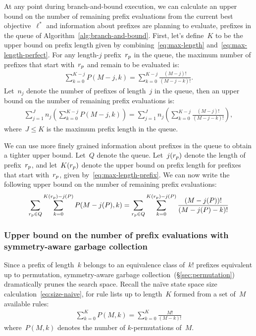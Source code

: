 At any point during branch-and-bound execution, we can calculate an upper bound
on the number of remaining prefix evaluations from the current best objective~$\ell^*$
and information about prefixes are planning to evaluate,
\ie prefixes in the queue of Algorithm~\ref{alg:branch-and-bound}.
%
First, let's define~$K$ to be the upper bound on prefix length
given by combining~\eqref{eq:max-length} and~\eqref{eq:max-length-perfect}.
%
For any length-$j$ prefix~${r_p}$ in the queue,
the maximum number of prefixes that start with~${r_p}$ and remain to be evaluated is:
\begin{align}
\sum_{k=0}^{K-j} P(M-j, k) = \sum_{k=0}^{K-j} \frac{(M-j)!}{(M-j - k)!}.
\end{align}
Let~$n_j$ denote the number of prefixes of length~$j$ in the queue,
then an upper bound on the number of remaining prefix evaluations is:
\begin{align}
\sum_{j=1}^J n_j \left( \sum_{k=0}^{K-j} P(M-j, k) \right)
= \sum_{j=1}^J n_j \left( \sum_{k=0}^{K-j} \frac{(M-j)!}{(M-j - k)!} \right),
\end{align}
where~$J \le K$ is the maximum prefix length in the queue.

We can use more finely grained information about prefixes in the queue
to obtain a tighter upper bound.
%
Let~$Q$ denote the queue.
%
Let~$j({r_p})$ denote the length of prefix~${r_p}$,
and let~$K({r_p})$ denote the upper bound on prefix length
for prefixes that start with~${r_p}$, given by~\eqref{eq:max-length-prefix}.
%
We can now write the following upper bound on the number of remaining prefix evaluations:
\begin{align}
\sum_{\Prefix \in Q} \sum_{k=0}^{K(\Prefix) - j(P)} P(M - j(P), k)
= \sum_{\Prefix \in Q} \sum_{k=0}^{K(\Prefix) - j(P)} \frac{(M-j(P))!}{(M-j(P) - k)!}
\end{align}

\subsubsection{Upper bound on the number of prefix evaluations with symmetry-aware garbage collection}
\label{sec:permutation-counting}

Since a prefix of length~$k$ belongs to an equivalence class of~$k!$ prefixes
equivalent up to permutation, symmetry-aware garbage collection~(\S\ref{sec:permutation})
dramatically prunes the search space.
%
Recall the na\"ive state space size calculation~\eqref{eq:size-naive},
for rule lists up to length~$K$ formed from a set of~$M$ available rules:
\begin{align}
\sum_{k=0}^K P(M, k) = \sum_{k=0}^K \frac{M!}{(M - k)!}
\end{align}
where~${P(M, k)}$ denotes the number of $k$-permutations of~$M$.

